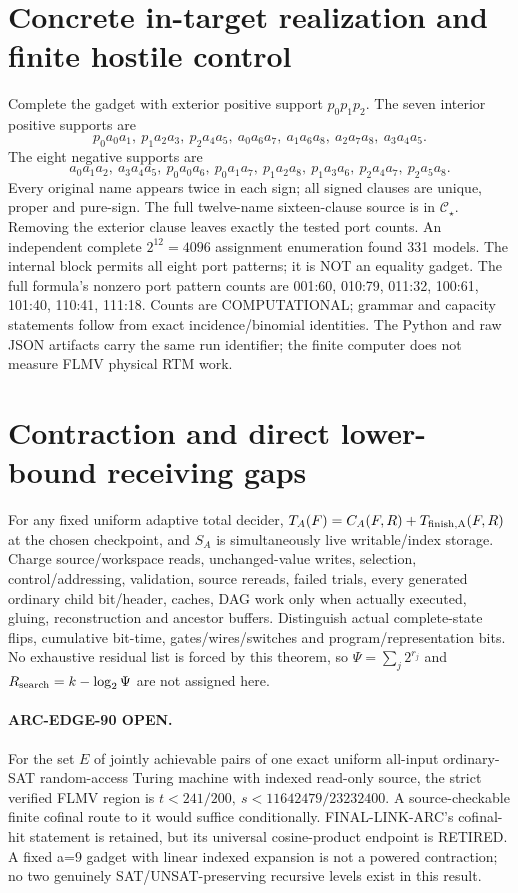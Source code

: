 \documentclass[11pt]{article}
\begin{document}
\section{Concrete in-target realization and finite hostile control}
Complete the gadget with exterior positive support $p_0p_1p_2$. The seven interior positive supports are
\[
p_0a_0a_1,\ p_1a_2a_3,\ p_2a_4a_5,\ a_0a_6a_7,\ a_1a_6a_8,\
a_2a_7a_8,\ a_3a_4a_5.
\]
The eight negative supports are
\[
a_0a_1a_2,\ a_3a_4a_5,\ p_0a_0a_6,\ p_0a_1a_7,\
p_1a_2a_8,\ p_1a_3a_6,\ p_2a_4a_7,\ p_2a_5a_8.
\]
Every original name appears twice in each sign; all signed clauses are unique, proper and pure-sign. The full twelve-name sixteen-clause source is in $\mathcal C_\star$. Removing the exterior clause leaves exactly the tested port counts. An independent complete $2^{12}=4096$ assignment enumeration found 331 models. The internal block permits all eight port patterns; it is NOT an equality gadget. The full formula's nonzero port pattern counts are 001:60, 010:79, 011:32, 100:61, 101:40, 110:41, 111:18. Counts are COMPUTATIONAL; grammar and capacity statements follow from exact incidence/binomial identities. The Python and raw JSON artifacts carry the same run identifier; the finite computer does not measure FLMV physical RTM work.
\section{Contraction and direct lower-bound receiving gaps}
For any fixed uniform adaptive total decider, $T_A(F)=C_A(F,R)+T_{\rm finish,A}(F,R)$ at the chosen checkpoint, and $S_A$ is simultaneously live writable/index storage. Charge source/workspace reads, unchanged-value writes, selection, control/addressing, validation, source rereads, failed trials, every generated ordinary child bit/header, caches, DAG work only when actually executed, gluing, reconstruction and ancestor buffers. Distinguish actual complete-state flips, cumulative bit-time, gates/wires/switches and program/representation bits. No exhaustive residual list is forced by this theorem, so $\Psi=\sum_j2^{r_j}$ and $R_{\rm search}=k-\log_2\Psi$ are not assigned here.
\paragraph{ARC-EDGE-90 OPEN.} For the set $E$ of jointly achievable pairs of one exact uniform all-input ordinary-SAT random-access Turing machine with indexed read-only source, the strict verified FLMV region is $t<241/200,\ s<11642479/23232400$. A source-checkable finite cofinal route to it would suffice conditionally. FINAL-LINK-ARC's cofinal-hit statement is retained, but its universal cosine-product endpoint is RETIRED. A fixed a=9 gadget with linear indexed expansion is not a powered contraction; no two genuinely SAT/UNSAT-preserving recursive levels exist in this result.
\end{document}
